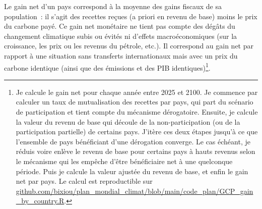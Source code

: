 \documentclass[a5paper,french,openany]{memoir}
\begin{document}
Le gain net d'un pays correspond à la moyenne des gains fiscaux de sa population~: il s'agit des recettes reçues (a priori en revenu de base) moins le prix du carbone payé. Ce gain net monétaire ne tient pas compte des dégâts du changement climatique subis ou évités ni d'effets macroéconomiques (sur la croissance, les prix ou les revenus du pétrole, etc.). Il correspond au gain net par rapport à une situation sans transferts internationaux mais avec un prix du carbone identique (ainsi que des émissions et des PIB identiques)\footnote{Je calcule le gain net pour chaque année entre 2025 et 2100. 
Je commence par calculer un taux de mutualisation des recettes par pays, qui part du scénario de participation et tient compte du mécanisme dérogatoire. Ensuite, je calcule la valeur du revenu de base qui découle de la non-participation (ou de la participation partielle) de certains pays. J'itère ces deux étapes jusqu'à ce que l'ensemble de pays bénéficiant d'une dérogation converge. 
Le cas échéant, je réduis voire enlève le revenu de base pour certains pays à hauts revenus selon le mécanisme qui les empêche d'être bénéficiaire net à une quelconque période. Puis je calcule la valeur ajustée du revenu de base, et enfin le gain net par pays. Le calcul est reproductible sur \href{https://github.com/bixiou/plan_mondial_climat/blob/main/code_plan/GCP_gain_by_country.R}{github.com/bixiou/plan\_mondial\_climat/blob/main/code\_plan/GCP\_gain\_by\_country.R}.}. 
\end{document}
